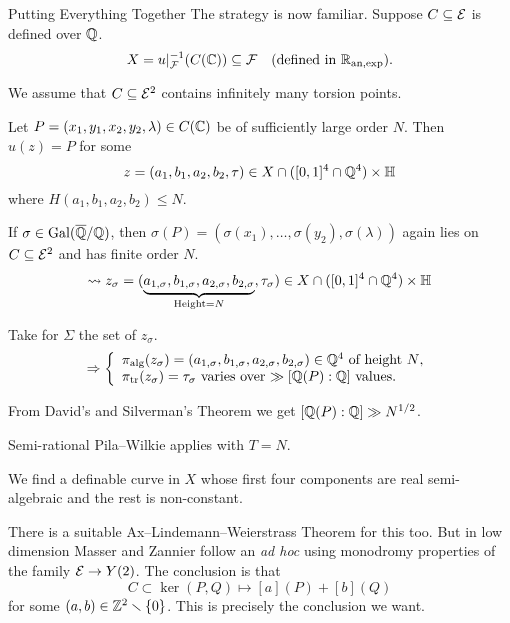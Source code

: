 \documentclass{beamer}
\begin{document}
\begin{frame}{Putting Everything Together}
  The strategy is now familiar. Suppose $C\subseteq{\mathcal E}$ is defined over
  ${\mathbb{Q}}$. 
  \begin{equation*}
    X = u|_{{\mathcal F}}^{-1}(C({\mathbb{C}})) \subseteq {\mathcal F} \quad\text{(defined in ${{\mathbb{R}}_{\mathrm{an,exp}}}$)}.
  \end{equation*}

  We assume that $C\subseteq{\mathcal E}^2$ contains infinitely many torsion points.

  Let $P=(x_1,y_1,x_2,y_2,\lambda)\in C({\mathbb{C}})$
  be of sufficiently large order $N$.
  Then $u(z) = P$
  for some $$z=(a_1,b_1,a_2,b_2,\tau)\in X\cap ([0,1]^4\cap{\mathbb{Q}}^4)\times {\mathbb{H}}$$
  where $H(a_1,b_1,a_2,b_2)\le N$.


  If $\sigma\in \mathrm{Gal}({\overline{\mathbb{Q}}}/{\mathbb{Q}})$, then $\sigma(P) =
  (\sigma(x_1),\ldots,\sigma(y_2),\sigma(\lambda))$  again lies on
  $C\subseteq{\mathcal E}^2$ and has finite order $N$.
  $$\leadsto z_\sigma =
  (\underbrace{a_{1,\sigma},b_{1,\sigma},a_{2,\sigma},b_{2,\sigma}}_{\text{Height}
    = N},\tau_\sigma)
  \in X\cap ([0,1]^4\cap{\mathbb{Q}}^4)\times {\mathbb{H}}$$
\end{frame}

\begin{frame}

  Take for $\Sigma$ the set of $z_\sigma$.
  \begin{equation*}
    \Rightarrow \left\{
      \begin{array}{l}
        \pi_{\mathrm{alg}}(z_\sigma) =
        (a_{1,\sigma},b_{1,\sigma},a_{2,\sigma},b_{2,\sigma})\in{\mathbb{Q}}^4
        \text{ of height $N$},\\
   \pi_{\mathrm{tr}}(z_\sigma)=\tau_\sigma  \text{ varies over $\gg [{\mathbb{Q}}(P):{\mathbb{Q}}]$ values.}
      \end{array}\right.
  \end{equation*}
  
  From David's and Silverman's Theorem we get   $[{\mathbb{Q}}(P):{\mathbb{Q}}]\gg N^{1/2}$.

  Semi-rational Pila--Wilkie applies with $T=N$.
  
  We find a definable curve  in $X$ whose
  first four components are real semi-algebraic and the rest is
  non-constant.
  
  There is a suitable Ax--Lindemann--Weierstrass Theorem for this too.
  But in low dimension Masser and Zannier follow an \textit{ad hoc}
  using monodromy properties of the family ${\mathcal E}\rightarrow Y(2)$. The
  conclusion is that
  $$ C \subset \ker{(P,Q)\mapsto [a](P)+[b](Q)}$$
  for some
  $(a,b)\in{\mathbb{Z}}^2\smallsetminus\{0\}$. This is precisely the conclusion we want.
\end{frame}
\end{document}
